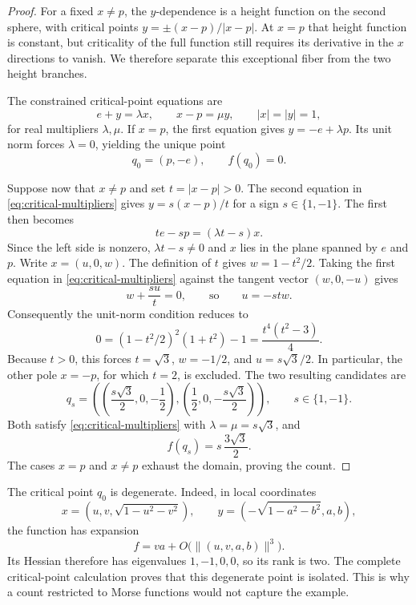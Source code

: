 \begin{proof}
For a fixed $x\ne p$, the $y$-dependence is a height function on the
second sphere, with critical points $y=\pm(x-p)/|x-p|$.
At $x=p$ that height function is constant, but criticality of the full
function still requires its derivative in the $x$ directions to vanish.
We therefore separate this exceptional fiber from the two height branches.

The constrained critical-point equations are
\begin{equation}
\label{eq:critical-multipliers}
  e+y=\lambda x,\qquad x-p=\mu y,
  \qquad |x|=|y|=1,
\end{equation}
for real multipliers $\lambda,\mu$.
If $x=p$, the first equation gives $y=-e+\lambda p$.
Its unit norm forces $\lambda=0$, yielding the unique point
\[
  q_0=(p,-e),\qquad f(q_0)=0.
\]

Suppose now that $x\ne p$ and set $t=|x-p|>0$.
The second equation in \eqref{eq:critical-multipliers} gives
$y=s(x-p)/t$ for a sign $s\in\{1,-1\}$.
The first then becomes
\[
  t e-s p=(\lambda t-s)x.
\]
Since the left side is nonzero, $\lambda t-s\ne0$ and $x$ lies in
the plane spanned by $e$ and $p$. Write $x=(u,0,w)$.
The definition of $t$ gives $w=1-t^2/2$.
Taking the first equation in \eqref{eq:critical-multipliers}
against the tangent vector $(w,0,-u)$ gives
\[
  w+\frac{s u}{t}=0,
  \qquad\text{so}\qquad u=-s t w.
\]
Consequently the unit-norm condition reduces to
\begin{equation}
\label{eq:critical-factorization}
  0=(1-t^2/2)^2(1+t^2)-1
   =\frac{t^4(t^2-3)}4.
\end{equation}
Because $t>0$, this forces $t=\sqrt3$, $w=-1/2$, and
$u=s\sqrt3/2$. In particular, the other pole $x=-p$, for which $t=2$,
is excluded. The two resulting candidates are
\begin{equation}
\label{eq:other-critical-points}
  q_s=
  \left(
    \left(\frac{s\sqrt3}{2},0,-\frac12\right),
    \left(\frac12,0,-\frac{s\sqrt3}{2}\right)
  \right),
  \qquad s\in\{1,-1\}.
\end{equation}
Both satisfy \eqref{eq:critical-multipliers} with
$\lambda=\mu=s\sqrt3$, and
\[
  f(q_s)=s\,\frac{3\sqrt3}{2}.
\]
The cases $x=p$ and $x\ne p$ exhaust the domain, proving the count.
\end{proof}

\begin{remark}
\label{rem:degenerate-critical-point}
The critical point $q_0$ is degenerate. Indeed, in local coordinates
\[
  x=(u,v,\sqrt{1-u^2-v^2}),\qquad
  y=(-\sqrt{1-a^2-b^2},a,b),
\]
the function has expansion
\[
  f=va+O\bigl(\lVert(u,v,a,b)\rVert^3\bigr).
\]
Its Hessian therefore has eigenvalues $1,-1,0,0$, so its rank is two.
The complete critical-point calculation proves that this degenerate point
is isolated. This is why a count restricted to Morse functions would not
capture the example.
\end{remark}
